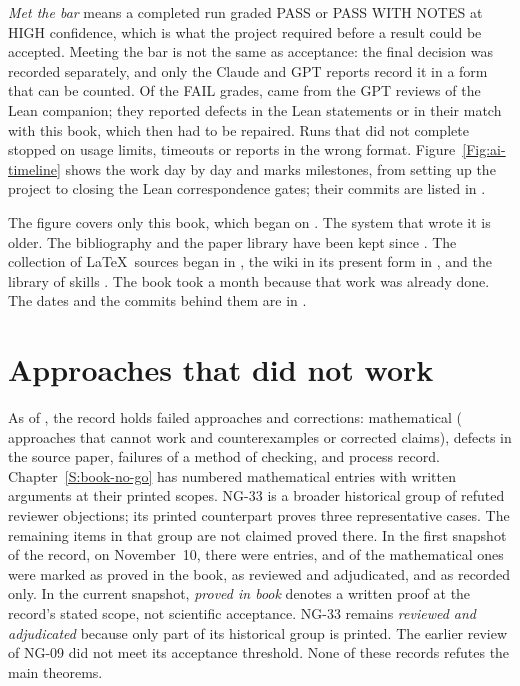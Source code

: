 \emph{Met the bar} means a completed run graded PASS or PASS WITH NOTES at HIGH
confidence, which is what the project required before a result could be
accepted. Meeting the bar is not the same as acceptance: the final decision was
recorded separately, and only the Claude and GPT reports record it in a form
that can be counted. Of the \aiRunsFail{} FAIL grades, \aiFailGPT{} came from
the GPT reviews of the Lean companion; they reported defects in the Lean
statements or in their match with this book, which then had to be repaired. Runs
that did not complete stopped on usage limits, timeouts or reports in the wrong
format. Figure~\ref{Fig:ai-timeline} shows the work day by day and marks
\aiMilestones{} milestones, from setting up the project to closing the Lean
correspondence gates; their commits are listed in
.

The figure covers only this book, which began on \aiInfraBookStart{}. The
system that wrote it is older. The bibliography and the paper library have been
kept since \aiInfraBibStart{}. The collection of \LaTeX\ sources began in
\aiInfraSourcesStart{}, the wiki in its present form in \aiInfraWikiStart{}, and
the library of skills \aiInfraSkillsWhen{}. The book took a month because that
work was already done. The dates and the commits behind them are in
.

\section*{Approaches that did not work}

As of \aiNogoSnapshot{}, the record holds \aiNogoTotal{} failed approaches
and corrections: \aiNogoMath{} mathematical (\aiNogoRoutes{} approaches that
cannot work and \aiNogoCounter{} counterexamples or corrected claims),
\aiNogoSource{} defects in the source paper, \aiNogoMethod{} failures of a
method of checking, and \aiNogoProcess{} process record.
Chapter~\ref{S:book-no-go} has \aiNogoMath{} numbered mathematical entries
with written arguments at their printed scopes. NG-33 is a broader historical
group of refuted reviewer objections; its printed counterpart proves three
representative cases. The remaining items in that group are not claimed
proved there. In the first snapshot of the record, on November~10,
there were \aiNogoTotalFirst{} entries, and \aiNogoInBookFirst{} of the
mathematical ones were marked as proved in the book, \aiNogoReviewedFirst{} as
reviewed and adjudicated, and \aiNogoRecordedFirst{} as recorded only.
In the current snapshot, \emph{proved in book} denotes a written proof at
the record's stated scope, not scientific acceptance. NG-33 remains
\emph{reviewed and adjudicated} because only part of its historical group is
printed. The earlier review of NG-09 did not meet its acceptance threshold.
None of these records refutes the main theorems.

